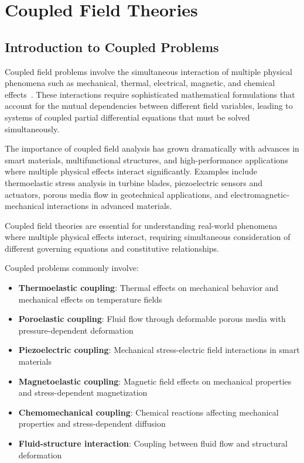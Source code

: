 \chapter{Coupled Field Theories}

\section{Introduction to Coupled Problems}

Coupled field problems involve the simultaneous interaction of multiple physical phenomena such as mechanical, thermal, electrical, magnetic, and chemical effects~\autocite{Sadd.2019}. These interactions require sophisticated mathematical formulations that account for the mutual dependencies between different field variables, leading to systems of coupled partial differential equations that must be solved simultaneously.

The importance of coupled field analysis has grown dramatically with advances in smart materials, multifunctional structures, and high-performance applications where multiple physical effects interact significantly. Examples include thermoelastic stress analysis in turbine blades, piezoelectric sensors and actuators, porous media flow in geotechnical applications, and electromagnetic-mechanical interactions in advanced materials.

\begin{keypoint}
Coupled field theories are essential for understanding real-world phenomena where multiple physical effects interact, requiring simultaneous consideration of different governing equations and constitutive relationships.
\end{keypoint}

Coupled problems commonly involve:
\begin{itemize}
\item \textbf{Thermoelastic coupling}: Thermal effects on mechanical behavior and mechanical effects on temperature fields
\item \textbf{Poroelastic coupling}: Fluid flow through deformable porous media with pressure-dependent deformation
\item \textbf{Piezoelectric coupling}: Mechanical stress-electric field interactions in smart materials
\item \textbf{Magnetoelastic coupling}: Magnetic field effects on mechanical properties and stress-dependent magnetization
\item \textbf{Chemomechanical coupling}: Chemical reactions affecting mechanical properties and stress-dependent diffusion
\item \textbf{Fluid-structure interaction}: Coupling between fluid flow and structural deformation
\end{itemize}

